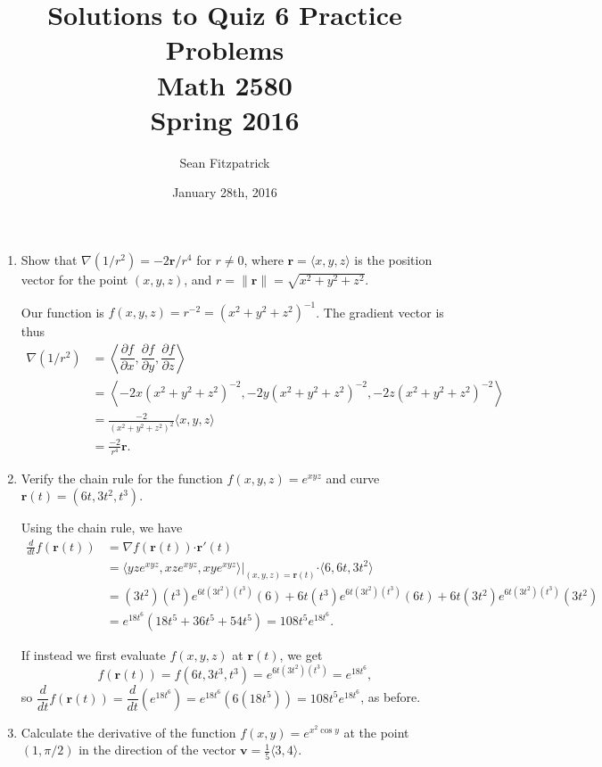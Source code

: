 \documentclass[letterpaper,12pt]{article}
\title{Solutions to Quiz 6 Practice Problems\\Math 2580\\Spring 2016}
\author{Sean Fitzpatrick}
\date{January 28th, 2016}
\newcommand{\pd}[2]{\dfrac{\partial #1}{\partial #2}}
\newcommand{\dotp}{\boldsymbol{\cdot}}
\begin{document}
 \maketitle


\begin{enumerate}
 \item Show that $\nabla(1/r^2) = -2\mathbf{r}/r^4$ for $r\neq 0$, where $\mathbf{r}=\langle x,y,z\rangle$ is the position vector for the point $(x,y,z)$, and $r=\lVert \mathbf{r}\rVert = \sqrt{x^2+y^2+z^2}$.

\bigskip

Our function is $f(x,y,z) = r^{-2} = (x^2+y^2+z^2)^{-1}$. The gradient vector is thus
\begin{align*}
 \nabla (1/r^2) &= \left\langle \pd{f}{x}, \pd{f}{y}, \pd{f}{z}\right\rangle\\
& = \left\langle -2x(x^2+y^2+z^2)^{-2}, -2y(x^2+y^2+z^2)^{-2}, -2z(x^2+y^2+z^2)^{-2}\right\rangle\\
& = \frac{-2}{(x^2+y^2+z^2)^2}\langle x,y,z\rangle\\
& = \frac{-2}{r^4}\mathbf{r}.
\end{align*}

 \item Verify the chain rule for the function $f(x,y,z) = e^{xyz}$ and curve $\mathbf{r}(t)=(6t,3t^2,t^3)$.

\bigskip

Using the chain rule, we have
\begin{align*}
 \frac{d}{dt}f(\mathbf{r}(t)) & = \nabla f(\mathbf{r}(t))\dotp \mathbf{r}'(t)\\
& = \left.\langle yze^{xyz}, xze^{xyz}, xye^{xyz}\rangle\right|_{(x,y,z)=\mathbf{r}(t)}\dotp \langle 6, 6t, 3t^2\rangle\\
& = (3t^2)(t^3)e^{6t(3t^2)(t^3)}(6)+6t(t^3)e^{6t(3t^2)(t^3)}(6t)+6t(3t^2)e^{6t(3t^2)(t^3)}(3t^2)\\
& = e^{18t^6}(18t^5+36t^5+54t^5) = 108t^5e^{18t^6}.
\end{align*}

If instead we first evaluate $f(x,y,z)$ at $\mathbf{r}(t)$, we get
\[
 f(\mathbf{r}(t))=f(6t,3t^3,t^3) = e^{6t(3t^2)(t^3)} = e^{18t^6},
\]
so $\dfrac{d}{dt}f(\mathbf{r}(t)) = \dfrac{d}{dt}(e^{18t^6}) = e^{18t^6}(6(18t^5)) = 108t^5e^{18t^6}$, as before.

 \bigskip

 
 \item Calculate the derivative of the function $f(x,y)=e^{x^2\cos y}$ at the point $(1,\pi/2)$ in the direction of the vector $\mathbf{v} = \frac{1}{5}\langle 3,4\rangle$.
 


\end{enumerate}
\end{document}
